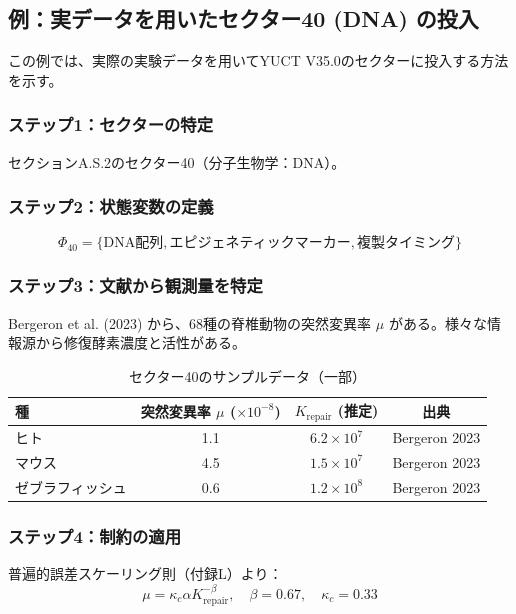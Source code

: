 \documentclass[13pt,a4paper]{ltjsarticle}
\begin{document}
	\subsection*{例：実データを用いたセクター40 (DNA) の投入}
	
	この例では、実際の実験データを用いてYUCT V35.0のセクターに投入する方法を示す。
	
	\subsubsection*{ステップ1：セクターの特定}
	セクションA.S.2のセクター40（分子生物学：DNA）。
	
	\subsubsection*{ステップ2：状態変数の定義}
	\[
	\Phi_{40} = \{ \text{DNA配列}, \text{エピジェネティックマーカー}, \text{複製タイミング} \}
	\]
	
	\subsubsection*{ステップ3：文献から観測量を特定}
	Bergeron et al. (2023) から、68種の脊椎動物の突然変異率 $\mu$ がある。様々な情報源から修復酵素濃度と活性がある。
	
	\begin{table}[htbp]
		\centering
		\caption{セクター40のサンプルデータ（一部）}
		\begin{tabular}{lccc}
			\toprule
			\textbf{種} & \textbf{突然変異率 $\mu$ ($\times 10^{-8}$)} & \textbf{$K_{\mathrm{repair}}$ (推定)} & \textbf{出典} \\
			\midrule
			ヒト & 1.1 & $6.2 \times 10^7$ & Bergeron 2023 \\
			マウス & 4.5 & $1.5 \times 10^7$ & Bergeron 2023 \\
			ゼブラフィッシュ & 0.6 & $1.2 \times 10^8$ & Bergeron 2023 \\
			\bottomrule
		\end{tabular}
	\end{table}
	
	\subsubsection*{ステップ4：制約の適用}
	普遍的誤差スケーリング則（付録L）より：
	\[
	\mu = \kappa_c \alpha K_{\mathrm{repair}}^{-\beta}, \quad \beta = 0.67, \quad \kappa_c = 0.33
	\]
	
\end{document}
